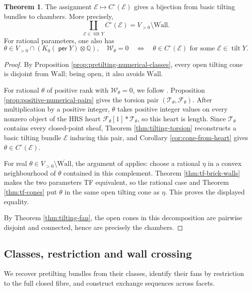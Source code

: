 \documentclass[a4paper,reqno]{amsart}
\def\E{\mathcal{E}}
\def\F{\mathcal{F}}
\def\T{\mathcal{T}}
\def\W{\mathcal{W}}
\DeclareMathOperator{\per}{\mathsf{per}}
\DeclareMathOperator{\tilt}{tilt}
\theoremstyle{definition}
\newtheorem{Thm}{Theorem}[section]
\begin{document}
\begin{Thm}\label{thm:tilting-chambers}
The assignment $\E\mapsto C^\circ(\E)$ gives a bijection from basic tilting bundles to chambers. More precisely,
\[
\coprod_{\E\in\tilt Y}C^\circ(\E)
=V_{>0}\setminus\overline{\mathrm{Wall}}.
\]
For rational parameters, one also has
\[
\theta\in V_{>0}\cap(K_0(\per Y)\otimes\mathbb Q),\quad\W_\theta=0
\quad\Longleftrightarrow\quad
\theta\in C^\circ(\E)\text{ for some }\E\in\tilt Y.
\]
\end{Thm}
\begin{proof}
By Proposition \ref{prop:pretilting-numerical-classes}, every open tilting cone is disjoint from $\mathrm{Wall}$; being open, it also avoids $\overline{\mathrm{Wall}}$.

For rational $\theta$ of positive rank with $\W_\theta=0$, we follow \cite[proof of Proposition 3.19]{Asa21}. Proposition \ref{prop:positive-numerical-pairs} gives the torsion pair $(\T_\theta,\F_\theta)$. After multiplication by a positive integer, $\theta$ takes positive integer values on every nonzero object of the HRS heart $\F_\theta[1]*\T_\theta$, so this heart is length. Since $\T_\theta$ contains every closed-point sheaf, Theorem \ref{thm:tilting-torsion} reconstructs a basic tilting bundle $\E$ inducing this pair, and Corollary \ref{cor:cone-from-heart} gives $\theta\in C^\circ(\E)$.

For real $\theta\in V_{>0}\setminus\overline{\mathrm{Wall}}$, the argument of \cite[proof of Theorem 3.17]{Asa21} applies: choose a rational $\eta$ in a convex neighbourhood of $\theta$ contained in this complement. Theorem \ref{thm:tf-brick-walls} makes the two parameters TF equivalent, so the rational case and Theorem \ref{thm:tf-cones} put $\theta$ in the same open tilting cone as $\eta$. This proves the displayed equality.

By Theorem \ref{thm:tilting-fan}, the open cones in this decomposition are pairwise disjoint and connected, hence are precisely the chambers.
\end{proof}

\subsection{Classes, restriction and wall crossing}

We recover pretilting bundles from their classes, identify their fans by restriction to the full closed fibre, and construct exchange sequences across facets.
\end{document}
